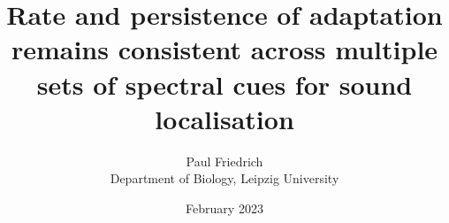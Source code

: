 \documentclass[12pt]{article}
\newcommand\thesistitle{Rate and persistence of adaptation remains consistent across multiple sets of spectral cues for sound localisation}
\begin{document}
\title{\thesistitle}%
\author{Paul Friedrich\\Department of Biology, Leipzig University}
\date{February 2023}
\maketitle









\nocite{*}

\end{document}
